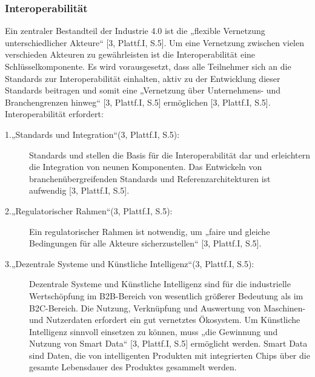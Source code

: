 \subsubsection{Interoperabilität}\label{sec:Interoperabilität}
Ein zentraler Bestandteil der Industrie 4.0 ist die „flexible Vernetzung unterschiedlicher Akteure“ [3, Plattf.I, S.5]. Um eine Vernetzung zwischen vielen verschieden Akteuren zu gewährleisten ist die Interoperabilität eine Schlüsselkomponente. Es wird vorausgesetzt, dass alle Teilnehmer sich an die Standards zur Interoperabilität einhalten, aktiv zu der Entwicklung dieser Standards beitragen und somit eine „Vernetzung über Unternehmens- und Branchengrenzen hinweg“ [3, Plattf.I, S.5] ermöglichen [3, Plattf.I, S.5]. Interoperabilität erfordert:
\begin{description}
	\item[1.„Standards und Integration“(3, Plattf.I, S.5):]
	
	Standards und stellen die Basis für die Interoperabilität dar und erleichtern die Integration
	von neunen Komponenten. Das Entwickeln von branchenübergreifenden Standards und
	Referenzarchitekturen ist aufwendig [3, Plattf.I, S.5].
		
	\item[2.„Regulatorischer Rahmen“(3, Plattf.I, S.5):]
	
	Ein regulatorischer Rahmen ist notwendig, um „faire und gleiche Bedingungen für alle
	Akteure sicherzustellen“ [3, Plattf.I, S.5].

	\item[3.„Dezentrale Systeme und Künstliche Intelligenz“(3, Plattf.I, S.5):]
	
	Dezentrale Systeme und Künstliche Intelligenz sind für die industrielle Wertschöpfung im 
	B2B-Bereich von wesentlich größerer Bedeutung als im B2C-Bereich. Die Nutzung,
	Verknüpfung und Auswertung von Maschinen- und Nutzerdaten erfordert ein gut vernetztes
	Ökosystem. Um Künstliche Intelligenz sinnvoll einsetzen zu können, muss „die Gewinnung 
	und Nutzung von Smart Data“ [3, Plattf.I, S.5] ermöglicht werden. Smart Data sind Daten, die 
	von intelligenten Produkten mit integrierten Chips über die gesamte Lebensdauer des 
	Produktes gesammelt werden.
\end{description}

